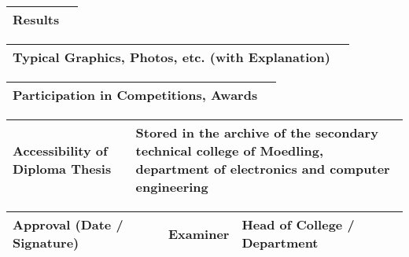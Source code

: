 \vspace{10pt}

\noindent
\begin{tabular}{|m{}|m{}|}
\hline
Results &  \\
\hline
\end{tabular}

\pagebreak

\pagebreak
\noindent
\begin{tabular}{|m{}|m{}|}
\hline
Typical Graphics, Photos, etc. (with Explanation) & \\
\hline
\end{tabular}


\vspace{10pt}

\noindent
\begin{tabular}{|m{}|m{}|}
\hline
Participation in Competitions, Awards & \\
\hline
\end{tabular}

\vspace{10pt}

\noindent
\begin{tabular}{|m{}|m{}|}
\hline
Accessibility of \newline Diploma Thesis & Stored in the archive of the secondary technical college of Moedling, department of electronics and computer engineering \\
\hline
\end{tabular}

\vspace{10pt}

\noindent
\begin{tabular}{|m{}|m{}|m{}|}
\hline
Approval (Date / Signature) &
 {\tiny Examiner \newline \newline} \vspace{30pt} &
  {\tiny Head of College / Department \newline \newline} \vspace{30pt} \\
\hline
\end{tabular}